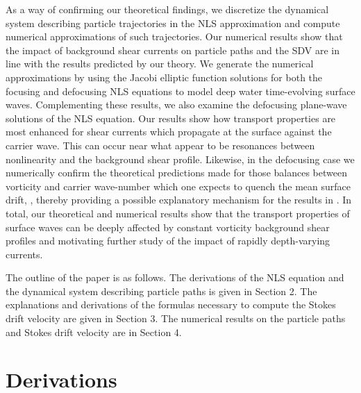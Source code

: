 \documentclass{JFM_Style/jfm}
\begin{document}
As a way of confirming our theoretical findings, we discretize the dynamical system describing particle trajectories in the NLS approximation and compute numerical approximations of such trajectories. Our numerical results show that the impact of background shear currents on particle paths and the SDV are in line with the results predicted by our theory. We generate the numerical approximations by using the Jacobi elliptic function solutions for both the focusing and defocusing NLS equations to model deep water time-evolving surface waves.  Complementing these results, we also examine the defocusing plane-wave solutions of the NLS equation.  Our results show how transport properties are most enhanced for shear currents which propagate at the surface against the carrier wave.  This can occur near what appear to be resonances between nonlinearity and the background shear profile.  Likewise, in the defocusing case we numerically confirm the theoretical predictions made for those balances between vorticity and carrier wave-number which one expects to quench the mean surface drift, , thereby providing a possible explanatory mechanism for the results in \cite{smith,breivik,monismith}.  In total, our theoretical and numerical results show that the transport properties of surface waves can be deeply affected by constant vorticity background shear profiles and motivating further study of the impact of rapidly depth-varying currents.  

The outline of the paper is as follows.  The derivations of the NLS equation and the dynamical system describing particle paths is given in Section 2.  The explanations and derivations of the formulas necessary to compute the Stokes drift velocity are given in Section 3.  The numerical results on the particle paths and Stokes drift velocity are in Section 4. 
\section{Derivations}
\end{document}
